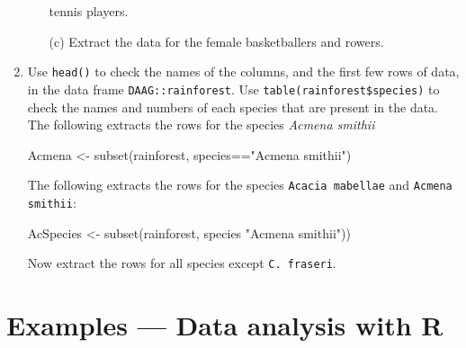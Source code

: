 \documentclass{tufte-book}\usepackage[]{graphicx}\usepackage[]{color}
\begin{document}
\begin{enumerate}
\begin{itemize}
tennis players.
\item[(c)] Extract the data for the female basketballers and rowers.
\end{itemize}
\item Use \texttt{head()} to check the names of the columns, and the first
few rows of data, in the data frame \texttt{DAAG::rainforest}.
Use \verb!table(rainforest$species)! to check the names and numbers of
each species that are present in the data.
The following extracts the rows for the species \textit{Acmena smithii}
\begin{Schunk}
\begin{Sinput}
Acmena <- subset(rainforest, species=="Acmena smithii")
\end{Sinput}
\end{Schunk}
The following extracts the rows for the species \texttt{Acacia mabellae} and
\texttt{Acmena smithii}:
\begin{fullwidth}

\begin{Schunk}
\begin{Sinput}
AcSpecies <- subset(rainforest, species %
                                               "Acmena smithii"))
\end{Sinput}
\end{Schunk}

\end{fullwidth}
Now extract the rows for all species except \texttt{C. fraseri}.
\end{enumerate}
\cleartooddpage
\cleartooddpage

\chapter{Examples --- Data analysis with R}\label{ch:worked}

\end{document}
